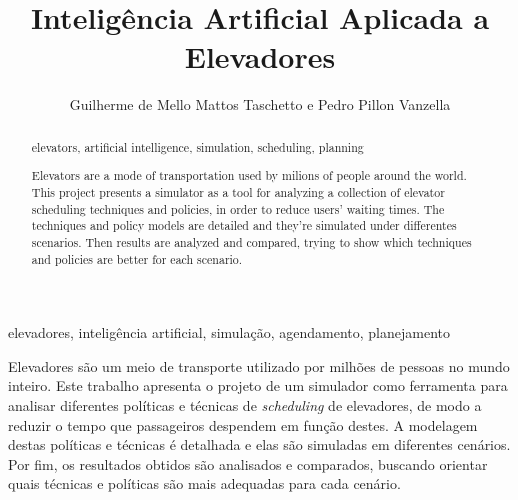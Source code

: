 \documentclass[portuguese,oneside]{tcc}
\author{Guilherme de Mello Mattos Taschetto e Pedro Pillon Vanzella}
\title{Inteligência Artificial Aplicada a Elevadores}
      {Artificial Intelligence Applied to Elevators}
\begin{document}
\begin{resumo}{elevadores, inteligência artificial, simulação, agendamento, planejamento}

Elevadores são um meio de transporte utilizado por milhões de pessoas no mundo
inteiro. Este trabalho apresenta o projeto de um simulador como ferramenta para
analisar diferentes políticas e técnicas de \textit{scheduling} de elevadores,
de modo a reduzir o tempo que passageiros despendem em função destes. A
modelagem destas políticas e técnicas é detalhada e elas são simuladas em
diferentes cenários. Por fim, os resultados obtidos são analisados e comparados,
buscando orientar quais técnicas e políticas são mais adequadas para cada
cenário.

\end{resumo}

\begin{abstract}{elevators, artificial intelligence, simulation, scheduling, planning}

Elevators are a mode of transportation used by milions of people around the
world. This project presents a simulator as a tool for analyzing a collection of
elevator scheduling techniques and policies, in order to reduce users' waiting
times. The techniques and policy models are detailed and they're simulated
under differentes scenarios. Then results are analyzed and compared, trying to
show which techniques and policies are better for each scenario.

\end{abstract}

\listoffigures
\listofalgorithms
\tableofcontents












\end{document}

